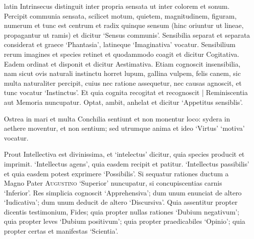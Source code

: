 \begin{otherlanguage*}{latin}
\pstart
 Intrinsecus distinguit inter propria sensata ut inter colorem et sonum. Percipit communia sensata, scilicet motum, quietem, magnitudinem, figuram, numerum et tunc est centrum et radix quinque sensum (hinc oriuntur ut lineae, propagantur ut ramis) et dicitur `Sensus communis'. Sensibilia separat et separata considerat et graece `Phantasia', latineque `Imaginativa' vocatur. Sensibilium rerum imagines et species retinet et quodammodo coagit et dicitur Cogitativa. Eadem ordinat et disponit et dicitur Aestimativa. Etiam cognoscit insensibilia, nam sicut ovis naturali instinctu horret lupum, gallina vulpem, felis canem, sic multa naturaliter percipit, cuius nec ratione assequetur, nec causas agnoscit, et tunc vocatur `Instinctus'. Et quia cognita recogitat et recognoscit \textnormal{|} Reminiscentia aut Memoria nuncupatur. Optat, ambit, anhelat et dicitur `Appetitus sensiblis'. 
\pend

\pstart
 Ostrea in mari et multa Conchilia sentiunt et non monentur loco: sydera in aethere moventur, et non sentium; sed utrumque anima et ideo `Virtus' `motiva' vocatur. 
\pend

\pstart
 Prout Intellectiva est divinissima, et `intelectus' dicitur, quia species producit et imprimit. `Intellectus agens', quia easdem recipit et patitur. `Intellectus passibilis' et quia easdem potest exprimere `Possibilis'. Si sequatur rationes ductum a Magno Pater \textsc{Augustino} `Superior' nuncupatur, si concupiscentias carnis `Inferior'. Res simplicia cognoscit `Apprehensiva'; dum unum enunciat de altero `Iudicativa'; dum unum deducit de altero `Discursiva'. Quia assentitur propter dicentis testimonium, Fides; quia propter nullas rationes `Dubium negativum'; quia propter leves `Dubium positivum'; quia propter praedicabiles `Opinio'; quia propter certas et manifestas `Scientia'. 
\pend


\end{otherlanguage*}
